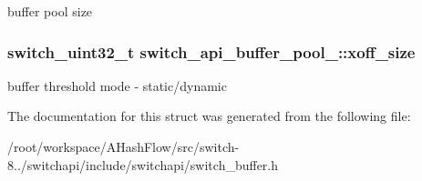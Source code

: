 buffer pool size \hypertarget{structswitch__api__buffer__pool___a392fac4a31d36b146f407f7174122c3a}{
\subsubsection[{xoff\+\_\+size}]{\setlength{\rightskip}{0pt plus 5cm}switch\+\_\+uint32\+\_\+t switch\+\_\+api\+\_\+buffer\+\_\+pool\+\_\+\+::xoff\+\_\+size}}\label{structswitch__api__buffer__pool___a392fac4a31d36b146f407f7174122c3a}
buffer threshold mode -\/ static/dynamic 

The documentation for this struct was generated from the following file\+:\begin{DoxyCompactItemize}
\item 
/root/workspace/\+A\+Hash\+Flow/src/switch-\/8../switchapi/include/switchapi/switch\+\_\+buffer.\+h\end{DoxyCompactItemize}
